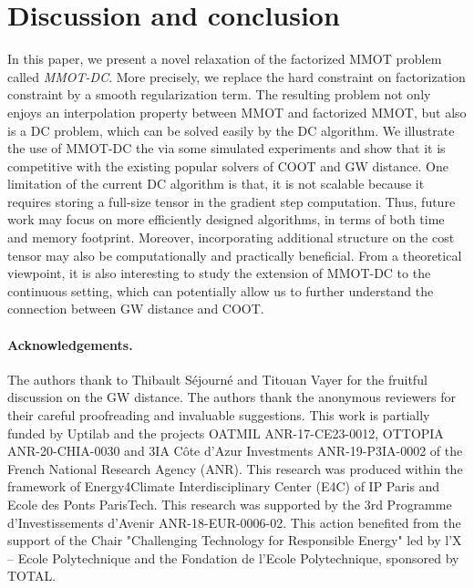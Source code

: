 \documentclass{article}
\begin{document}
\section{Discussion and conclusion}
In this paper, we present a novel relaxation of the factorized MMOT problem called \textit{MMOT-DC}. More precisely, we replace the hard constraint on factorization 
constraint by a smooth regularization term. The resulting problem 
not only enjoys an interpolation property between MMOT and factorized MMOT, but also is a DC problem, 
which can be solved easily by the DC algorithm. We illustrate the use of MMOT-DC the via some simulated experiments and show that 
it is competitive with the existing popular solvers of COOT and GW distance. 
One limitation of the current DC algorithm is that, it is not scalable because
it requires storing a full-size tensor in the gradient step computation. Thus, future
work may focus on more efficiently designed algorithms, in terms of both time and memory footprint. 
Moreover, incorporating additional structure on the cost tensor may also be computationally and practically beneficial. 
From a theoretical viewpoint, it is also interesting to study the extension of MMOT-DC to the continuous setting, 
which can potentially allow us to further understand the connection between GW distance and COOT.

\paragraph{Acknowledgements.} The authors thank to Thibault Séjourné and Titouan Vayer for the fruitful discussion on the GW distance. 
The authors thank the anonymous reviewers for their careful proofreading and invaluable suggestions. This work is partially funded 
by Uptilab and the projects OATMIL ANR-17-CE23-0012, OTTOPIA ANR-20-CHIA-0030 and 
3IA Côte d'Azur Investments ANR-19-P3IA-0002 of the French National Research Agency (ANR). This research was produced within the 
framework of Energy4Climate Interdisciplinary Center (E4C) of IP Paris and Ecole des Ponts ParisTech. This research was supported 
by the 3rd Programme d’Investissements d’Avenir ANR-18-EUR-0006-02. This action benefited from the support of the Chair 
"Challenging Technology for Responsible Energy" led by l’X – Ecole Polytechnique and the Fondation de l’Ecole Polytechnique, 
sponsored by TOTAL.
\end{document}
